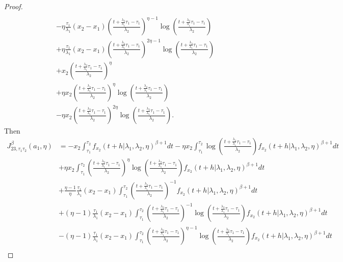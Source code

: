\documentclass{article}
\begin{document}
\begin{proof}
\begin{align*}
\\
&-\eta\frac{\tau_1}{\lambda_1}(x_2-x_1)\left(\frac{t+\frac{\lambda_2}{\lambda_1}\tau_1-\tau_1}{\lambda_2}\right)^{\eta-1}\log\left(\frac{t+\frac{\lambda_2}{\lambda_1}\tau_1-\tau_1}{\lambda_2}\right)
\\
&+\eta\frac{\tau_1}{\lambda_1}(x_2-x_1)\left(\frac{t+\frac{\lambda_2}{\lambda_1}\tau_1-\tau_1}{\lambda_2}\right)^{2\eta-1}\log\left(\frac{t+\frac{\lambda_2}{\lambda_1}\tau_1-\tau_1}{\lambda_2}\right)
\\
&+x_2\left(\frac{t+\frac{\lambda_2}{\lambda_1}\tau_1-\tau_1}{\lambda_2}\right)^{\eta}
\\
&+\eta x_2\left(\frac{t+\frac{\lambda_2}{\lambda_1}\tau_1-\tau_1}{\lambda_2}\right)^{\eta}\log\left(\frac{t+\frac{\lambda_2}{\lambda_1}\tau_1-\tau_1}{\lambda_2}\right)
\\
&-\eta x_2\left(\frac{t+\frac{\lambda_2}{\lambda_1}\tau_1-\tau_1}{\lambda_2}\right)^{2\eta}\log\left(\frac{t+\frac{\lambda_2}{\lambda_1}\tau_1-\tau_1}{\lambda_2}\right).
\end{align*}
Then
\begin{align*}
J_{23,\tau_1\tau_2}^{\beta}(a_1,\eta)&=-x_2\int_{\tau_1}^{\tau_2}f_{x_2}(t+h|\lambda_1,\lambda_2,\eta)^{\beta+1}dt
-\eta x_2 \int_{\tau_1}^{\tau_2}\log\left(\frac{t+\frac{\lambda_2}{\lambda_1}\tau_1-\tau_1}{\lambda_2}\right)f_{x_2}(t+h|\lambda_1,\lambda_2,\eta)^{\beta+1}dt
\\
& +\eta x_2 \int_{\tau_1}^{\tau_2}\left(\frac{t+\frac{\lambda_2}{\lambda_1}\tau_1-\tau_1}{\lambda_2}\right)^{\eta}\log\left(\frac{t+\frac{\lambda_2}{\lambda_1}\tau_1-\tau_1}{\lambda_2}\right)f_{x_2}(t+h|\lambda_1,\lambda_2,\eta)^{\beta+1}dt
\\
& + \frac{\eta-1}{\eta}\frac{\tau_1}{\lambda_1}(x_2-x_1) \int_{\tau_1}^{\tau_2}\left(\frac{t+\frac{\lambda_2}{\lambda_1}\tau_1-\tau_1}{\lambda_2}\right)^{-1}f_{x_2}(t+h|\lambda_1,\lambda_2,\eta)^{\beta+1}dt
\\
&+(\eta-1)\frac{\tau_1}{\lambda_1}(x_2-x_1) \int_{\tau_1}^{\tau_2}\left(\frac{t+\frac{\lambda_2}{\lambda_1}\tau_1-\tau_1}{\lambda_2}\right)^{-1}\log\left(\frac{t+\frac{\lambda_2}{\lambda_1}\tau_1-\tau_1}{\lambda_2}\right)f_{x_2}(t+h|\lambda_1,\lambda_2,\eta)^{\beta+1}dt
\\
&-(\eta-1)\frac{\tau_1}{\lambda_1}(x_2-x_1) \int_{\tau_1}^{\tau_2}\left(\frac{t+\frac{\lambda_2}{\lambda_1}\tau_1-\tau_1}{\lambda_2}\right)^{\eta-1}\log\left(\frac{t+\frac{\lambda_2}{\lambda_1}\tau_1-\tau_1}{\lambda_2}\right)f_{x_2}(t+h|\lambda_1,\lambda_2,\eta)^{\beta+1}dt
\\

\end{align*}
\end{proof}
\end{document}

